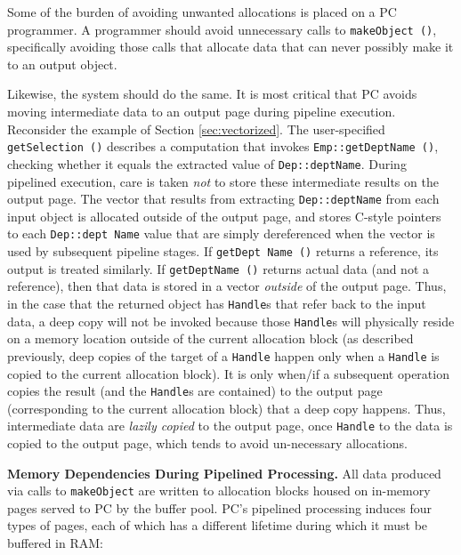 Some of the burden of avoiding unwanted allocations is placed on a PC programmer. A programmer should
avoid unnecessary calls to \texttt{makeObject ()}, specifically avoiding those calls that allocate data that can never possibly make it to an output object.

Likewise, the system should do the same.  It is most critical that PC avoids moving intermediate data to an output page during pipeline execution.
Reconsider the example of Section \ref{sec:vectorized}.  The user-specified \texttt{getSelection ()} describes
a computation that invokes \texttt{Emp::getDeptName ()}, checking whether it equals the extracted value of
\texttt{Dep::deptName}.  During pipelined execution, care is taken \emph{not} to store these intermediate results
on the output page.  The vector that results from extracting
\texttt{Dep::deptName} from each input object is allocated outside of
the output page, and stores C-style pointers to each \texttt{Dep::dept
  Name}
value that are simply dereferenced when the vector is used by subsequent pipeline stages.  
If \texttt{getDept Name ()} returns a reference, its output is treated similarly.  If 
\texttt{getDeptName ()} returns actual data (and not a reference), then that data is stored in a vector \emph{outside}
of the output page.  Thus, in the case that the returned object has \texttt{Handle}s that refer back to the input data, a deep
copy will not be invoked because those \texttt{Handle}s will physically reside on a memory location outside of the current
allocation block (as described previously, deep copies of the target of a \texttt{Handle}
happen only when a \texttt{Handle} is copied to the current allocation block).  
It is only when/if a subsequent operation copies the result (and the \texttt{Handle}s are contained)
to the output page (corresponding to the current allocation block)
that a deep copy happens.  Thus, intermediate data are \emph{lazily copied} to 
the output page, once \texttt{Handle} to the data is copied to the output page, which tends to avoid un-necessary allocations.

\vspace{5 pt}
\noindent
\textbf{Memory Dependencies During Pipelined Processing.}
All data produced via calls to \texttt{makeObject} are written to
allocation blocks housed on in-memory pages served to PC by the buffer
pool.  PC's pipelined
processing induces four types of pages, each of which has a different lifetime during which it must be buffered in RAM:

